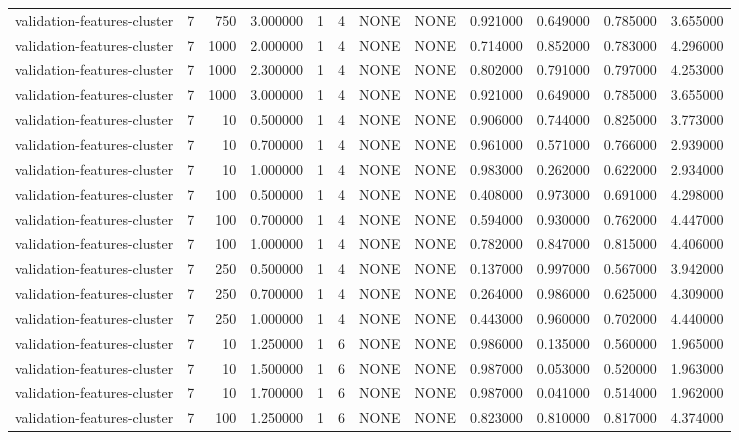 \begin{tabular}{lrrrllllrrrr}
validation-features-cluster & 7 & 750 & 3.000000 & 1 & 4 & NONE & NONE & 0.921000 & 0.649000 & 0.785000 & 3.655000 \\
validation-features-cluster & 7 & 1000 & 2.000000 & 1 & 4 & NONE & NONE & 0.714000 & 0.852000 & 0.783000 & 4.296000 \\
validation-features-cluster & 7 & 1000 & 2.300000 & 1 & 4 & NONE & NONE & 0.802000 & 0.791000 & 0.797000 & 4.253000 \\
validation-features-cluster & 7 & 1000 & 3.000000 & 1 & 4 & NONE & NONE & 0.921000 & 0.649000 & 0.785000 & 3.655000 \\
validation-features-cluster & 7 & 10 & 0.500000 & 1 & 4 & NONE & NONE & 0.906000 & 0.744000 & 0.825000 & 3.773000 \\
validation-features-cluster & 7 & 10 & 0.700000 & 1 & 4 & NONE & NONE & 0.961000 & 0.571000 & 0.766000 & 2.939000 \\
validation-features-cluster & 7 & 10 & 1.000000 & 1 & 4 & NONE & NONE & 0.983000 & 0.262000 & 0.622000 & 2.934000 \\
validation-features-cluster & 7 & 100 & 0.500000 & 1 & 4 & NONE & NONE & 0.408000 & 0.973000 & 0.691000 & 4.298000 \\
validation-features-cluster & 7 & 100 & 0.700000 & 1 & 4 & NONE & NONE & 0.594000 & 0.930000 & 0.762000 & 4.447000 \\
validation-features-cluster & 7 & 100 & 1.000000 & 1 & 4 & NONE & NONE & 0.782000 & 0.847000 & 0.815000 & 4.406000 \\
validation-features-cluster & 7 & 250 & 0.500000 & 1 & 4 & NONE & NONE & 0.137000 & 0.997000 & 0.567000 & 3.942000 \\
validation-features-cluster & 7 & 250 & 0.700000 & 1 & 4 & NONE & NONE & 0.264000 & 0.986000 & 0.625000 & 4.309000 \\
validation-features-cluster & 7 & 250 & 1.000000 & 1 & 4 & NONE & NONE & 0.443000 & 0.960000 & 0.702000 & 4.440000 \\
validation-features-cluster & 7 & 10 & 1.250000 & 1 & 6 & NONE & NONE & 0.986000 & 0.135000 & 0.560000 & 1.965000 \\
validation-features-cluster & 7 & 10 & 1.500000 & 1 & 6 & NONE & NONE & 0.987000 & 0.053000 & 0.520000 & 1.963000 \\
validation-features-cluster & 7 & 10 & 1.700000 & 1 & 6 & NONE & NONE & 0.987000 & 0.041000 & 0.514000 & 1.962000 \\
validation-features-cluster & 7 & 100 & 1.250000 & 1 & 6 & NONE & NONE & 0.823000 & 0.810000 & 0.817000 & 4.374000 \\

\end{tabular}
